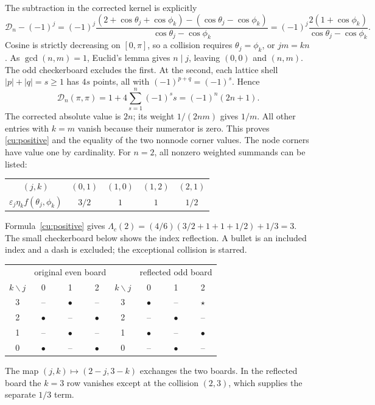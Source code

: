 The subtraction in the corrected kernel is explicitly
\[
 \mathcal D_n-(-1)^j
 =(-1)^j\frac{(2+\cos\theta_j+\cos\phi_k)
                    -(\cos\theta_j-\cos\phi_k)}{\cos\theta_j-\cos\phi_k}
 =(-1)^j\frac{2(1+\cos\phi_k)}{\cos\theta_j-\cos\phi_k}.
\]
Cosine is strictly decreasing on $[0,\pi]$, so a collision requires
$\theta_j=\phi_k$, or $jm=kn$. As $\gcd(n,m)=1$, Euclid's lemma gives
$n\mid j$, leaving $(0,0)$ and $(n,m)$. The odd checkerboard excludes
the first. At the second, each lattice shell $|p|+|q|=s\geq1$ has
$4s$ points, all with $(-1)^{p+q}=(-1)^s$. Hence
\[
 \mathcal D_n(\pi,\pi)=1+4\sum_{s=1}^n(-1)^ss=(-1)^n(2n+1).
\]
The corrected absolute value is $2n$; its weight $1/(2nm)$ gives $1/m$.
All other entries with $k=m$ vanish because their numerator is zero. This proves \eqref{cu:positive} and the equality of the two
nonnode corner values. The node corners have value one by cardinality.
For $n=2$, all nonzero weighted summands can be listed:
\begin{center}
\begin{tabular}{ccccc}
\toprule
$(j,k)$ & $(0,1)$ & $(1,0)$ & $(1,2)$ & $(2,1)$\\
$\varepsilon_j\eta_k f(\theta_j,\phi_k)$ & $3/2$ & $1$ & $1$ & $1/2$\\
\bottomrule
\end{tabular}
\end{center}
Formula~\eqref{cu:positive} gives
$\Lambda_c(2)=(4/6)(3/2+1+1+1/2)+1/3=3$.
The small checkerboard below shows the index reflection. A bullet is an
included index and a dash is excluded; the exceptional collision is starred.
\begin{center}
\begin{tabular}{c|ccc@{\qquad\qquad}c|ccc}
&\multicolumn{3}{c}{original even board}&&\multicolumn{3}{c}{reflected odd board}\\
$k\backslash j$&0&1&2&$k\backslash j$&0&1&2\\\hline
3&--&$\bullet$&--&3&$\bullet$&--&$\star$\\
2&$\bullet$&--&$\bullet$&2&--&$\bullet$&--\\
1&--&$\bullet$&--&1&$\bullet$&--&$\bullet$\\
0&$\bullet$&--&$\bullet$&0&--&$\bullet$&--
\end{tabular}
\end{center}
The map $(j,k)\mapsto(2-j,3-k)$ exchanges the two boards. In the
reflected board the $k=3$ row vanishes except at the collision $(2,3)$,
which supplies the separate $1/3$ term.



